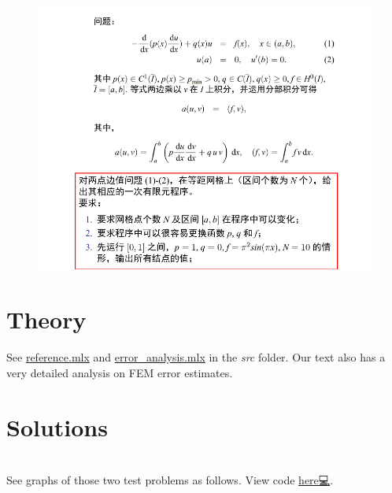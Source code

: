 \documentclass[a4paper,english]{article}
\begin{document}
	\begin{figure}[!hb]
		\centering
		\includegraphics[width=0.7\linewidth]{img/problem}
		\caption*{}
		\label{fig:problem}
	\end{figure}

	
	\section{Theory }
	See 
	\href{https://github.com/How-u-doing/Numerical_Analysis/blob/master/Chapter10_BVPforODEs/reference.mlx}{reference.mlx}
	\cite{NA9e}  and 
	\href{https://github.com/How-u-doing/Numerical_Analysis/blob/master/Chapter10_BVPforODEs/error_analysis.mlx}{error\_analysis.mlx}
	\cite{chap5}	in the \emph{src} folder.
	Our text \cite{LiRonghua} also has a very detailed analysis on
	FEM error estimates.
	
	
	\section{Solutions}	
	🔑 🔑 🔑 \\[5pt]	
	See graphs of those two test problems as follows. View code 
	\hyperref[Code]{here💻}.
	
	\clearpage
\end{document}
